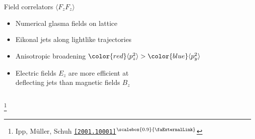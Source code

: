 \documentclass[aspectratio=169,11pt,usenames,dvipsnames]{beamer}
\renewcommand{\thefootnote}{\color{customblue}\faPaperPlaneO}
\newcommand\blfootnote[1]{%
  \begingroup
  \renewcommand\thefootnote{}\footnote{#1}%
  \addtocounter{footnote}{-1}%
  \endgroup
}
\begin{document}
\begin{frame}[t,noframenumbering]
\begin{columns}[onlytextwidth,t]
        \begin{center}
            {\Large\color{isgold} Field correlators $\langle F_zF_z\rangle$ \\[10pt]}
            \footnotesize
                \begin{itemize}
                    \item {\color{lightgray}Numerical glasma fields on lattice}
                    \item {\color{lightgray} Eikonal jets along lightlike trajectories}
                    \item {\color{lightgray}Anisotropic broadening ${\color{red}\langle p^2_z\rangle}>{\color{blue}\langle p^2_y\rangle}$}
                    \item {\color{lightgray} {\color{red}Electric fields $E_z$} are more efficient at \\deflecting jets than {\color{blue}magnetic fields $B_z$}}
                \end{itemize}
        \end{center}
    \end{columns}
    \blfootnote{\scriptsize Ipp, Müller, Schuh \href{https://arxiv.org/abs/2001.10001}{\color{palgold}\texttt{[2001.10001]}$^\text{\scalebox{0.9}{\faExternalLink}}$}}
\end{frame}



\end{document}
